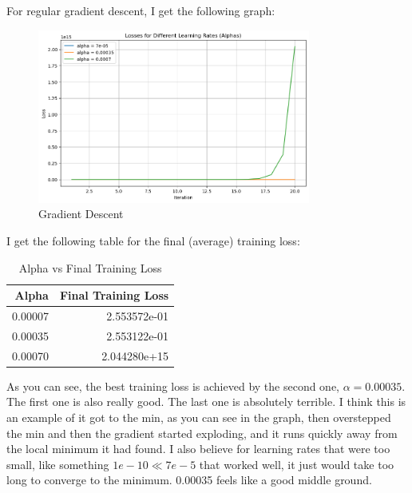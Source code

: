\documentclass[12pt]{article}
\theoremstyle{definitionstyle}
\begin{document}
\begin{enumerate}[leftmargin=\labelsep]
\begin{enumerate}[label=(\alph*)]
            For regular gradient descent, I get the following graph:
            \begin{figure}[H]
                \centering
                \includegraphics[width=0.8\textwidth]{grad_descent_output.png}
                \caption{Gradient Descent}
                \label{fig:gd}
            \end{figure}

            I get the following table for the final (average) training loss:
            \begin{table}[H]
                \centering
                \caption{Alpha vs Final Training Loss}
                \label{tab:alpha_vs_loss}
                \begin{tabular}{rr}
                \toprule
                  Alpha &  Final Training Loss \\
                \midrule
                0.00007 &         2.553572e-01 \\
                0.00035 &         2.553122e-01 \\
                0.00070 &         2.044280e+15 \\
                \bottomrule
                \end{tabular}
            \end{table}

            As you can see, the best training loss is achieved by the second one, $\alpha = 0.00035$. The first one is also really good. The last one is absolutely terrible. I think this is an example of it got to the min, as you can see in the graph, then overstepped the min and then the gradient started exploding, and it runs quickly away from the local minimum it had found. I also believe for learning rates that were too small, like something $1e-10 \ll 7e-5$ that worked well, it just would take too long to converge to the minimum. 0.00035 feels like a good middle ground.


\end{enumerate}
\end{enumerate}
\end{document}
